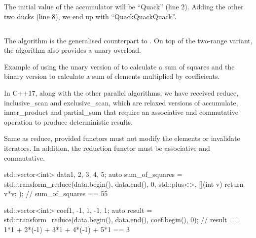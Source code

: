 The initial value of the accumulator will be “Quack” (line 2). Adding the other two ducks (line 8), we end up with “QuackQuackQuack”.

\subsection{\texorpdfstring{}{\texttt{std::transform\_reduce}}}

The  algorithm is the generalised counterpart to . On top of the two-range variant, the algorithm also provides a unary overload.


\begin{box-note}
\footnotesize Example of using the unary version of  to calculate a sum of squares and the binary version to calculate a sum of elements multiplied by coefficients.
\tcblower
{}
\end{box-note}


In C++17, along with the other parallel algorithms, we have received reduce, inclusive\_scan and exclusive\_scan, which are relaxed versions of accumulate, inner\_product and partial\_sum that require an associative and commutative operation to produce deterministic results.

Same as reduce, provided functors must not modify the elements or invalidate iterators. In addition, the reduction functor must be associative and commutative.

\begin{box-note}
\begin{cppcode}
std::vector<int> data{1, 2, 3, 4, 5};
auto sum_of_squares = std::transform_reduce(data.begin(), data.end(), 0, 
                                            std::plus<>{}, [](int v) { return v*v; });
// sum_of_squares == 55

std::vector<int> coef{1, -1, 1, -1, 1};
auto result = std::transform_reduce(data.begin(), data.end(), coef.begin(), 0);
// result == 1*1 + 2*(-1) + 3*1 + 4*(-1) + 5*1 == 3
\end{cppcode}
\end{box-note}

